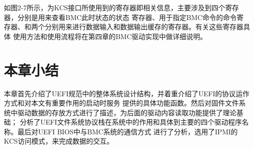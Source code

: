 如图2-7所示，为KCS接口所使用到的寄存器即相关信息，主要涉及到四个寄存器，分别是用来查看BMC此时状态的状态
寄存器、用于指定BMC命令的命令寄存器、和两个分别用来进行数据输入和数据输出缓存的寄存器。有关这些寄存器具体
使用方法和使用流程将在第四章的BMC驱动实现中做详细说明。

%
%



%
%
\section{本章小结}
本章首先介绍了UEFI规范中的整体系统设计结构，并着重介绍了UEFI的协议运作方式和对本文有重要作用的启动时服务
提供的具体功能函数。然后对固件文件系统中驱动数据的存放方式进行了描述，为后面的驱动内容读取功能提供了理论基础；
分析了UEFI文件系统协议栈在系统中的作用和具体到主要的四个驱动程序名称。最后对UEFI BIOS中与BMC系统的通信方式
进行了分析，选用了IPMI的KCS访问模式，来完成数据的交互。

